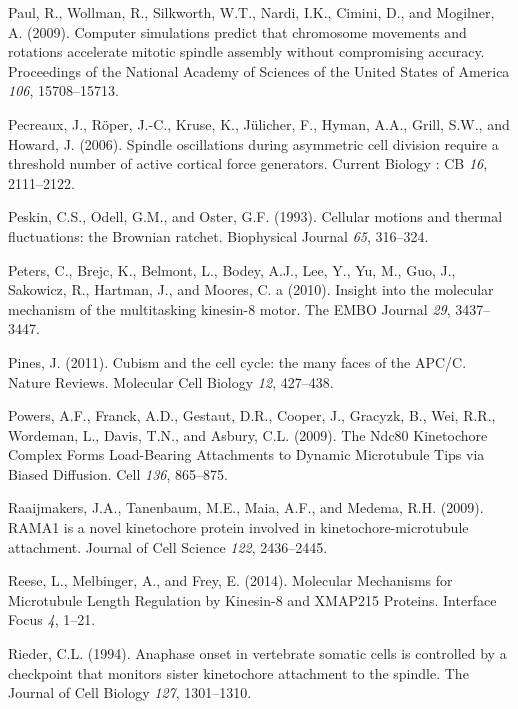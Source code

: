 \documentclass[12pt,a4paper,twoside,openright]{book}
\begin{document}
\hypertarget{ref-Paul2009}{}
Paul, R., Wollman, R., Silkworth, W.T., Nardi, I.K., Cimini, D., and
Mogilner, A. (2009). Computer simulations predict that chromosome
movements and rotations accelerate mitotic spindle assembly without
compromising accuracy. Proceedings of the National Academy of Sciences
of the United States of America \emph{106}, 15708--15713.

\hypertarget{ref-Pecreaux2006a}{}
Pecreaux, J., Röper, J.-C., Kruse, K., Jülicher, F., Hyman, A.A., Grill,
S.W., and Howard, J. (2006). Spindle oscillations during asymmetric cell
division require a threshold number of active cortical force generators.
Current Biology : CB \emph{16}, 2111--2122.

\hypertarget{ref-Peskin1993}{}
Peskin, C.S., Odell, G.M., and Oster, G.F. (1993). Cellular motions and
thermal fluctuations: the Brownian ratchet. Biophysical Journal
\emph{65}, 316--324.

\hypertarget{ref-Peters2010}{}
Peters, C., Brejc, K., Belmont, L., Bodey, A.J., Lee, Y., Yu, M., Guo,
J., Sakowicz, R., Hartman, J., and Moores, C. a (2010). Insight into the
molecular mechanism of the multitasking kinesin-8 motor. The EMBO
Journal \emph{29}, 3437--3447.

\hypertarget{ref-Pines2011}{}
Pines, J. (2011). Cubism and the cell cycle: the many faces of the
APC/C. Nature Reviews. Molecular Cell Biology \emph{12}, 427--438.

\hypertarget{ref-Powers2009a}{}
Powers, A.F., Franck, A.D., Gestaut, D.R., Cooper, J., Gracyzk, B., Wei,
R.R., Wordeman, L., Davis, T.N., and Asbury, C.L. (2009). The Ndc80
Kinetochore Complex Forms Load-Bearing Attachments to Dynamic
Microtubule Tips via Biased Diffusion. Cell \emph{136}, 865--875.

\hypertarget{ref-Raaijmakers2009}{}
Raaijmakers, J.A., Tanenbaum, M.E., Maia, A.F., and Medema, R.H. (2009).
RAMA1 is a novel kinetochore protein involved in kinetochore-microtubule
attachment. Journal of Cell Science \emph{122}, 2436--2445.

\hypertarget{ref-Reese2014a}{}
Reese, L., Melbinger, A., and Frey, E. (2014). Molecular Mechanisms for
Microtubule Length Regulation by Kinesin-8 and XMAP215 Proteins.
Interface Focus \emph{4}, 1--21.

\hypertarget{ref-Rieder1994}{}
Rieder, C.L. (1994). Anaphase onset in vertebrate somatic cells is
controlled by a checkpoint that monitors sister kinetochore attachment
to the spindle. The Journal of Cell Biology \emph{127}, 1301--1310.
\end{document}
